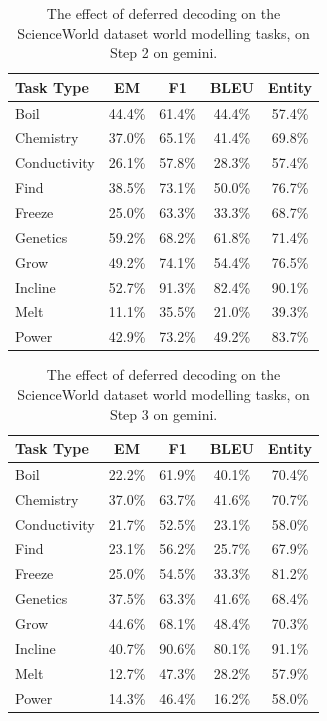 \begin{table}[h]
\centering
    \setlength\tabcolsep{15pt}
    \setlength\extrarowheight{0pt}
\caption{The effect of deferred decoding on the ScienceWorld dataset \citep{wang-etal-2022-scienceworld} world modelling tasks, on Step 2 on gemini.}
\label{tab:scienceworld31}
\begin{tabular}{lcccc}
\toprule
\textbf{Task Type} & \textbf{EM} & \textbf{F1}
  & \textbf{BLEU} & \textbf{Entity}\\
\midrule
Boil & 44.4\% & 61.4\% & 44.4\% & 57.4\% \\
Chemistry & 37.0\% & 65.1\% & 41.4\% & 69.8\% \\
Conductivity & 26.1\% & 57.8\% & 28.3\% & 57.4\% \\
Find & 38.5\% & 73.1\% & 50.0\% & 76.7\% \\
Freeze & 25.0\% & 63.3\% & 33.3\% & 68.7\% \\
Genetics & 59.2\% & 68.2\% & 61.8\% & 71.4\% \\
Grow & 49.2\% & 74.1\% & 54.4\% & 76.5\% \\
Incline & 52.7\% & 91.3\% & 82.4\% & 90.1\% \\
Melt & 11.1\% & 35.5\% & 21.0\% & 39.3\% \\
Power & 42.9\% & 73.2\% & 49.2\% & 83.7\% \\

\bottomrule
\end{tabular}
\end{table}


\begin{table}[h]
\centering
    \setlength\tabcolsep{15pt}
    \setlength\extrarowheight{0pt}
\caption{The effect of deferred decoding on the ScienceWorld dataset \citep{wang-etal-2022-scienceworld} world modelling tasks, on Step 3 on gemini.}
\label{tab:scienceworld32}
\begin{tabular}{lcccc}
\toprule
\textbf{Task Type} & \textbf{EM} & \textbf{F1}
  & \textbf{BLEU} & \textbf{Entity}\\
\midrule
Boil & 22.2\% & 61.9\% & 40.1\% & 70.4\% \\
Chemistry & 37.0\% & 63.7\% & 41.6\% & 70.7\% \\
Conductivity & 21.7\% & 52.5\% & 23.1\% & 58.0\% \\
Find & 23.1\% & 56.2\% & 25.7\% & 67.9\% \\
Freeze & 25.0\% & 54.5\% & 33.3\% & 81.2\% \\
Genetics & 37.5\% & 63.3\% & 41.6\% & 68.4\% \\
Grow & 44.6\% & 68.1\% & 48.4\% & 70.3\% \\
Incline & 40.7\% & 90.6\% & 80.1\% & 91.1\% \\
Melt & 12.7\% & 47.3\% & 28.2\% & 57.9\% \\
Power & 14.3\% & 46.4\% & 16.2\% & 58.0\% \\

\bottomrule
\end{tabular}
\end{table}

